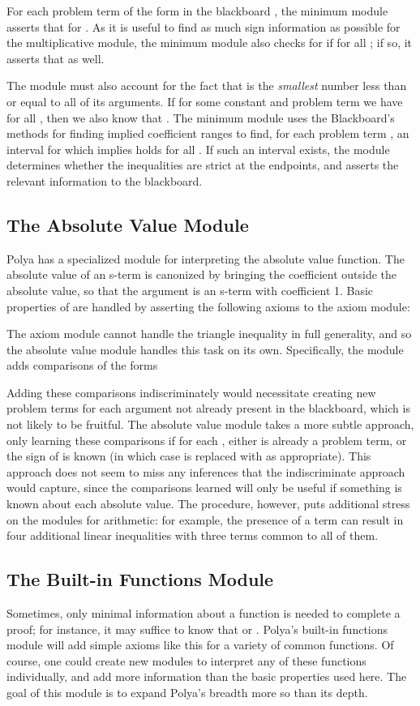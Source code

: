 \documentclass[runningheds]{llncs}
\begin{document}
For each problem term  of the form  in the blackboard , the minimum module asserts that  for . As it is useful to find as much sign information as possible for the multiplicative module, the minimum module also checks for  if  for all ; if so, it asserts that  as well.

The module must also account for the fact that  is the \emph{smallest} number less than or equal to all of its arguments. If for some constant  and problem term  we have  for all , then we also know that . The minimum module uses the Blackboard's methods for finding implied coefficient ranges  to find, for each problem term , an interval  for which  implies  holds for all . If such an interval exists, the module determines whether the inequalities are strict at the endpoints, and asserts the relevant information to the blackboard.

\subsection{The Absolute Value Module}
\label{subsection:absolute}
Polya has a specialized module for interpreting the absolute value function. The absolute value of an s-term is canonized by bringing the coefficient outside the absolute value, so that the argument is an s-term with coefficient 1. Basic properties of  are handled by asserting the following axioms to the axiom module:



The axiom module cannot handle the triangle inequality in full generality, and so the absolute value module handles this task on its own. Specifically, the module adds comparisons of the forms

Adding these comparisons indiscriminately would necessitate creating new problem terms  for each argument not already present in the blackboard, which is not likely to be fruitful. The absolute value module takes a more subtle approach, only learning these comparisons if for each , either  is already a problem term, or the sign of  is known (in which case  is replaced with  as appropriate). This approach does not seem to miss any inferences that the indiscriminate approach would capture, since the comparisons learned will only be useful if something is known about each absolute value. The procedure, however, puts additional stress on the modules for arithmetic: for example, the presence of a term  can result in four additional linear inequalities with three terms common to all of them.

\subsection{The Built-in Functions Module}
Sometimes, only minimal information about a function is needed to complete a proof; for instance, it may suffice to know that  or . Polya's built-in functions module will add simple axioms like this for a variety of common functions. Of course, one could create new modules to interpret any of these functions individually, and add more information than the basic properties used here. The goal of this module is to expand Polya's breadth more so than its depth.
\end{document}
